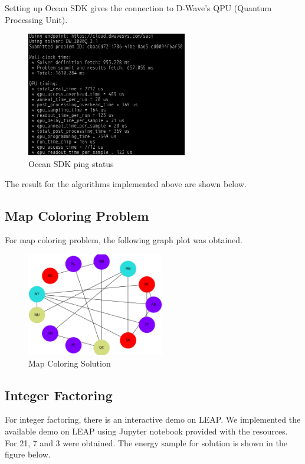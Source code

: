 \documentclass[12pt,conference]{IEEEtran}
\begin{document}
Setting up Ocean SDK gives the connection to D-Wave's QPU (Quantum Processing Unit).

\begin{figure}[h]
  \centering
  \includegraphics[width=7cm]{sdk.png}
  \caption{Ocean SDK ping status}
  \label{fig:OSDK}
\end{figure}


The result for the algorithms implemented above are shown below. 

\subsection{Map Coloring Problem}

For map coloring problem, the following graph plot was obtained.
\begin{figure}[h]
  \centering
  \includegraphics[width=6cm]{map_coloring.png}
  \caption{Map Coloring Solution}
  \label{fig:MCS}
\end{figure}

\subsection{Integer Factoring}
For integer factoring, there is an interactive demo on LEAP. We implemented the available demo on LEAP using Jupyter notebook provided with the resources. For 21, 7 and 3 were obtained. The energy sample for solution is shown in the figure below.
\end{document}
